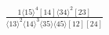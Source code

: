 \documentclass[varwidth, border=5pt]{standalone}
\begin{document}
\begin{my}
$\begin{gathered}
\scriptscriptstyle\frac{1⟨15⟩^4[14]⟨34⟩^2[23]}{⟨13⟩^2⟨14⟩^3⟨35⟩⟨45⟩[12][24]}
\end{gathered}$
\end{my}
\end{document}
